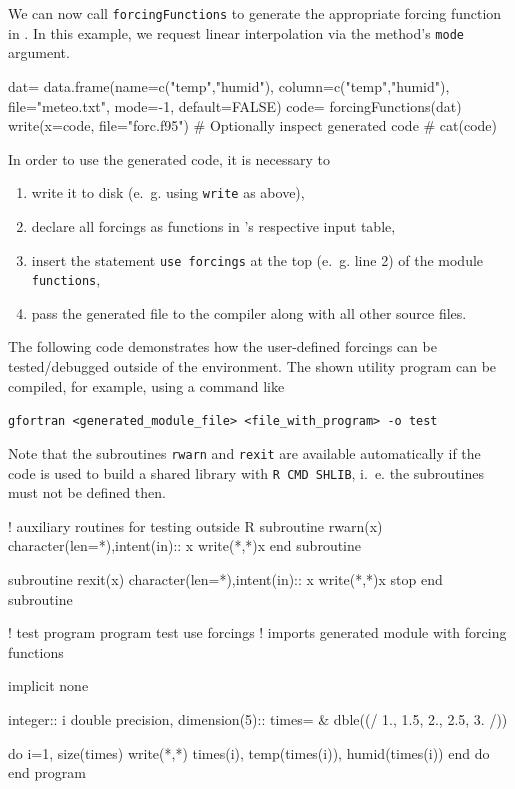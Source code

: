 \documentclass[times,onecolumn]{article}
\begin{document}
We can now call \verb|forcingFunctions| to generate the  appropriate forcing function in . In this example, we request linear interpolation via the method's \verb|mode| argument.

\begin{Schunk}
\begin{Sinput}
 dat= data.frame(name=c("temp","humid"),
   column=c("temp","humid"), file="meteo.txt", mode=-1, default=FALSE)
 code= forcingFunctions(dat)
 write(x=code, file="forc.f95")
 # Optionally inspect generated code
 # cat(code)
\end{Sinput}
\end{Schunk}

In order to use the generated code, it is necessary to
\begin{enumerate}
\item write it to disk (e.~g. using \verb|write| as above),
\item declare all forcings as functions in 's respective input table,
\item insert the statement \verb|use forcings| at the top (e.~g. line 2) of the  module \verb|functions|,
\item pass the generated file to the compiler along with all other  source files.
\end{enumerate}

The following  code demonstrates how the user-defined forcings can be tested/debugged outside of the  environment. The shown utility program can be compiled, for example, using a command like

\medskip
\verb|gfortran <generated_module_file> <file_with_program> -o test|

\medskip
Note that the subroutines \verb|rwarn| and \verb|rexit| are available automatically if the code is used to build a shared library with \verb|R CMD SHLIB|, i.~e. the subroutines must not be defined then.

\begin{shaded}
\begin{Schunk}
\begin{Soutput}
 ! auxiliary routines for testing outside R 
 subroutine rwarn(x) 
   character(len=*),intent(in):: x 
   write(*,*)x 
 end subroutine 
  
 subroutine rexit(x) 
   character(len=*),intent(in):: x 
   write(*,*)x 
   stop 
 end subroutine 
  
 ! test program 
 program test 
 use forcings  ! imports generated module with forcing functions 
  
 implicit none 
  
 integer:: i 
 double precision, dimension(5):: times= & 
   dble((/ 1., 1.5, 2., 2.5, 3. /)) 
  
 do i=1, size(times) 
   write(*,*) times(i), temp(times(i)), humid(times(i)) 
 end do 
 end program 
\end{Soutput}
\end{Schunk}
\end{shaded}
\end{document}
